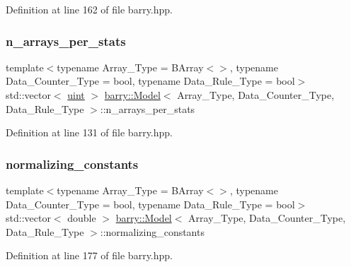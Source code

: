 Definition at line 162 of file barry.\+hpp.

\mbox{\label{classbarry_1_1_model_a6e72cbb235cf592668c286931a488830}} 
\subsubsection{\texorpdfstring{n\+\_\+arrays\+\_\+per\+\_\+stats}{n\_arrays\_per\_stats}}
{\footnotesize\ttfamily template$<$typename Array\+\_\+\+Type  = B\+Array$<$$>$, typename Data\+\_\+\+Counter\+\_\+\+Type  = bool, typename Data\+\_\+\+Rule\+\_\+\+Type  = bool$>$ \\
std\+::vector$<$ \hyperlink{namespacebarry_a11dfc53ddb4672278319aa04f1e09a6c}{uint} $>$ \hyperlink{classbarry_1_1_model}{barry\+::\+Model}$<$ Array\+\_\+\+Type, Data\+\_\+\+Counter\+\_\+\+Type, Data\+\_\+\+Rule\+\_\+\+Type $>$\+::n\+\_\+arrays\+\_\+per\+\_\+stats}



Definition at line 131 of file barry.\+hpp.

\mbox{\label{classbarry_1_1_model_a600630f5fad408c157b21404dbde4bc1}} 
\subsubsection{\texorpdfstring{normalizing\+\_\+constants}{normalizing\_constants}}
{\footnotesize\ttfamily template$<$typename Array\+\_\+\+Type  = B\+Array$<$$>$, typename Data\+\_\+\+Counter\+\_\+\+Type  = bool, typename Data\+\_\+\+Rule\+\_\+\+Type  = bool$>$ \\
std\+::vector$<$ double $>$ \hyperlink{classbarry_1_1_model}{barry\+::\+Model}$<$ Array\+\_\+\+Type, Data\+\_\+\+Counter\+\_\+\+Type, Data\+\_\+\+Rule\+\_\+\+Type $>$\+::normalizing\+\_\+constants}



Definition at line 177 of file barry.\+hpp.

\mbox{\label{classbarry_1_1_model_ace8577c5c0c7bd927a2337515155ab6f}} 
